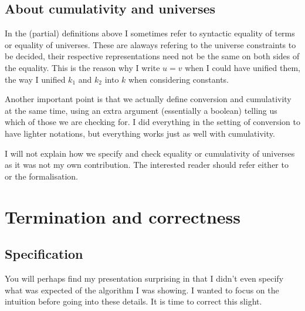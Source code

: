 \subsection{About cumulativity and universes}

In the (partial) definitions above I sometimes refer to syntactic equality of
terms or equality of universes. These are alaways refering to the universe
constraints to be decided, \ie their respective representations need not be the
same on both sides of the equality. This is the reason why I write \(u = v\)
when I could have unified them, the way I unified \(k_1\) and \(k_2\) into \(k\)
when considering constants.

Another important point is that we actually define conversion and cumulativity
at the same time, using an extra argument (essentially a boolean) telling us
which of those we are checking for.
I did everything in the setting of conversion to have lighter notations, but
everything works just as well with cumulativity.

I will not explain how we specify and check equality or cumulativity of
universes as it was not my own contribution.
The interested reader should refer either to~ or the
formalisation.

\section{Termination and correctness}

\subsection{Specification}

You will perhaps find my presentation surprising in that I didn't even specify
what was expected of the algorithm I was showing. I wanted to focus on the
intuition before going into these details.
It is time to correct this slight.

